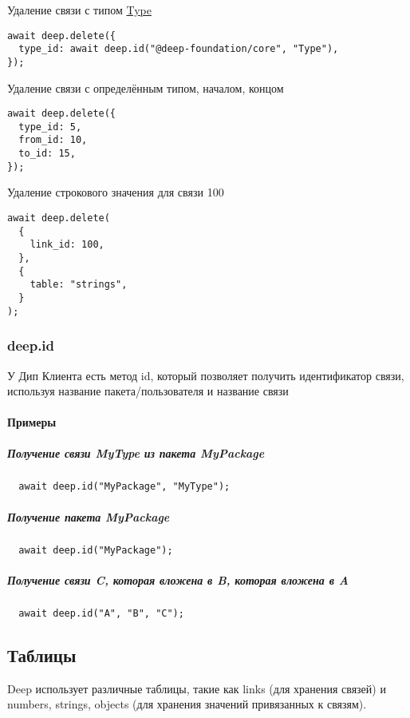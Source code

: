 \documentclass{article}
\begin{document}
Удаление связи с типом \hyperlink{Core.Type.Description}{Type}

\leavevmode
\begin{lstlisting}
await deep.delete({
  type_id: await deep.id("@deep-foundation/core", "Type"),
});
\end{lstlisting}

Удаление связи с определённым типом, началом, концом
\leavevmode
\begin{lstlisting}
await deep.delete({
  type_id: 5,
  from_id: 10,
  to_id: 15,
});
\end{lstlisting}

Удаление строкового значения для связи 100
\leavevmode
\begin{lstlisting}
await deep.delete(
  {
    link_id: 100,
  },
  {
    table: "strings",
  }
);
\end{lstlisting}

\subsubsection{deep.id}
У Дип Клиента есть метод id, который позволяет получить идентификатор связи,
используя название пакета/пользователя и название связи
\paragraph{Примеры}
\subparagraph{Получение связи MyType из пакета MyPackage}
\begin{lstlisting}
  await deep.id("MyPackage", "MyType");
\end{lstlisting}

\subparagraph{Получение пакета MyPackage}
\begin{lstlisting}
  await deep.id("MyPackage");
\end{lstlisting}

\subparagraph{Получение связи C, которая вложена в B, которая вложена в A}
\begin{lstlisting}
  await deep.id("A", "B", "C");
\end{lstlisting}

\subsection{Таблицы}
Deep использует различные таблицы, такие как links (для хранения связей) и
numbers, strings, objects (для хранения значений привязанных к связям).
\end{document}

